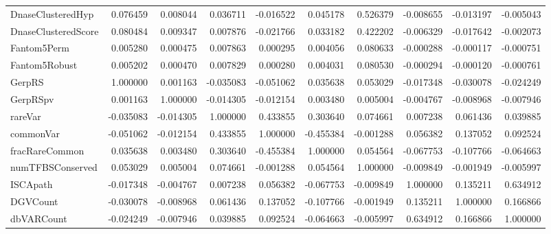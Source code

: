 \begin{tabular}{lrrrrrrrrr}
DnaseClusteredHyp   &  0.076459 &  0.008044 &  0.036711 &  -0.016522 &        0.045178 &          0.526379 & -0.008655 & -0.013197 &   -0.005043 \\
DnaseClusteredScore &  0.080484 &  0.009347 &  0.007876 &  -0.021766 &        0.033182 &          0.422202 & -0.006329 & -0.017642 &   -0.002073 \\
Fantom5Perm         &  0.005280 &  0.000475 &  0.007863 &   0.000295 &        0.004056 &          0.080633 & -0.000288 & -0.000117 &   -0.000751 \\
Fantom5Robust       &  0.005202 &  0.000470 &  0.007829 &   0.000280 &        0.004031 &          0.080530 & -0.000294 & -0.000120 &   -0.000761 \\
GerpRS              &  1.000000 &  0.001163 & -0.035083 &  -0.051062 &        0.035638 &          0.053029 & -0.017348 & -0.030078 &   -0.024249 \\
GerpRSpv            &  0.001163 &  1.000000 & -0.014305 &  -0.012154 &        0.003480 &          0.005004 & -0.004767 & -0.008968 &   -0.007946 \\
rareVar             & -0.035083 & -0.014305 &  1.000000 &   0.433855 &        0.303640 &          0.074661 &  0.007238 &  0.061436 &    0.039885 \\
commonVar           & -0.051062 & -0.012154 &  0.433855 &   1.000000 &       -0.455384 &         -0.001288 &  0.056382 &  0.137052 &    0.092524 \\
fracRareCommon      &  0.035638 &  0.003480 &  0.303640 &  -0.455384 &        1.000000 &          0.054564 & -0.067753 & -0.107766 &   -0.064663 \\
numTFBSConserved    &  0.053029 &  0.005004 &  0.074661 &  -0.001288 &        0.054564 &          1.000000 & -0.009849 & -0.001949 &   -0.005997 \\
ISCApath            & -0.017348 & -0.004767 &  0.007238 &   0.056382 &       -0.067753 &         -0.009849 &  1.000000 &  0.135211 &    0.634912 \\
DGVCount            & -0.030078 & -0.008968 &  0.061436 &   0.137052 &       -0.107766 &         -0.001949 &  0.135211 &  1.000000 &    0.166866 \\
dbVARCount          & -0.024249 & -0.007946 &  0.039885 &   0.092524 &       -0.064663 &         -0.005997 &  0.634912 &  0.166866 &    1.000000 \\
\bottomrule
\end{tabular}
